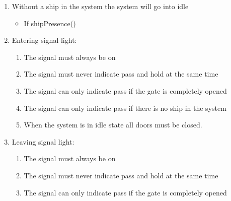 \begin{enumerate}
	\item Without a ship in the system the system will go into idle
		\begin{itemize}
			\item If shipPresence()
		\end{itemize}
	
	\item Entering signal light:
		\begin{enumerate}
			\item The signal must always be on
			\item The signal must never indicate pass and hold at the same time
			\item The signal can only indicate pass if the gate is completely opened
			\item The signal can only indicate pass if there is no ship in the system
			\item When the system is in idle state all doors must be closed.
			
		\end{enumerate}
	\item Leaving signal light:
		\begin{enumerate}
			\item The signal must always be on
			\item The signal must never indicate pass and hold at the same time
			\item The signal can only indicate pass if the gate is completely opened
		\end{enumerate}
\end{enumerate}
